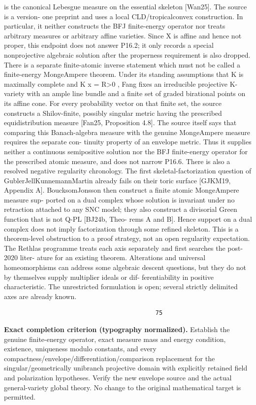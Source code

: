 \documentclass[
  10pt,
]{article}
\begin{document}
is the canonical Lebesgue measure on the essential skeleton {[}Wan25{]}.
The source is a version- one preprint and uses a local
CLD/tropicalconvex construction. In particular, it neither constructs
the BFJ finite-energy operator nor treats arbitrary measures or
arbitrary affine varieties. Since X is affine and hence not proper, this
endpoint does not answer P16.2; it only records a special nonprojective
algebraic solution after the properness requirement is also dropped.
There is a separate finite-atomic inverse statement which must not be
called a finite-energy MongeAmpere theorem. Under its standing
assumptions that K is maximally complete and \textbar K x \textbar{} =
R\textgreater0 , Fang fixes an irreducible projective K-variety with an
ample line bundle and a finite set of graded birational points on its
affine cone. For every probability vector on that finite set, the source
constructs a Shilov-finite, possibly singular metric having the
prescribed equidistribution measure {[}Fan25, Proposition 4.8{]}. The
source itself says that comparing this Banach-algebra measure with the
genuine MongeAmpere measure requires the separate con- tinuity property
of an envelope metric. Thus it supplies neither a continuous
semipositive solution nor the BFJ finite-energy operator for the
prescribed atomic measure, and does not narrow P16.6. There is also a
resolved negative regularity chronology. The first
skeletal-factorization question of GublerJellKunnemannMartin already
fails on their toric surface {[}GJKM19, Appendix A{]}. BoucksomJonsson
then construct a finite atomic MongeAmpere measure sup- ported on a dual
complex whose solution is invariant under no retraction attached to any
SNC model; they also construct a divisorial Green function that is not
Q-PL {[}BJ24b, Theo- rems A and B{]}. Hence support on a dual complex
does not imply factorization through some refined skeleton. This is a
theorem-level obstruction to a proof strategy, not an open regularity
expectation. The Rethlas programme treats each axis separately and first
searches the post-2020 liter- ature for an existing theorem. Alterations
and universal homeomorphisms can address some algebraic descent
questions, but they do not by themselves supply multiplier ideals or
dif- ferentiability in positive characteristic. The unrestricted
formulation is open; several strictly delimited axes are already known.

\begin{verbatim}
                                           75
\end{verbatim}

\textbf{Exact completion criterion (typography normalized).} Establish
the genuine finite-energy operator, exact measure mass and energy
condition, existence, uniqueness modulo constants, and every
compactness/envelope/differentiation/comparison replacement for the
singular/geometrically unibranch projective domain with explicitly
retained field and polarization hypotheses. Verify the new envelope
source and the actual general-variety global theory. No change to the
original mathematical target is permitted.
\end{document}
